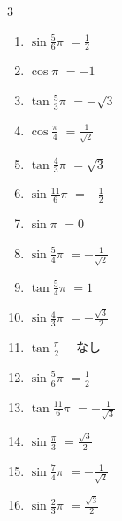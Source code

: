 \begin{multicols}{3}
\begin{enumerate}
  \item $\displaystyle \sin{\frac{5}{6}\pi}$
        $\displaystyle =\frac{1}{2}$

  \item $\displaystyle \cos{\pi}$
        $\displaystyle =-1$

  \item $\displaystyle \tan{\frac{5}{3}\pi}$
        $\displaystyle =-\sqrt{3}$

\columnbreak %

  \item $\displaystyle \cos{\frac{\pi}{4}}$
        $\displaystyle =\frac{1}{\sqrt{2}}$

  \item $\displaystyle \tan{\frac{4}{3}\pi}$
        $\displaystyle =\sqrt{3}$

  \item $\displaystyle \sin{\frac{11}{6}\pi}$
        $\displaystyle =-\frac{1}{2}$

  \item $\displaystyle \sin{\pi}$
        $\displaystyle =0$

  \item $\displaystyle \sin{\frac{5}{4}\pi}$
        $\displaystyle =-\frac{1}{\sqrt{2}}$

  \item $\displaystyle \tan{\frac{5}{4}\pi}$
        $\displaystyle =1$

  \item $\displaystyle \sin{\frac{4}{3}\pi}$
        $\displaystyle =-\frac{\sqrt{3}}{2}$

  \item $\displaystyle \tan{\frac{\pi}{2}}$
        $\displaystyle \quad なし$

  \item $\displaystyle \sin{\frac{5}{6}\pi}$
        $\displaystyle =\frac{1}{2}$

  \item $\displaystyle \tan{\frac{11}{6}\pi}$
        $\displaystyle =-\frac{1}{\sqrt{3}}$

  \item $\displaystyle \sin{\frac{\pi}{3}}$
        $\displaystyle =\frac{\sqrt{3}}{2}$

  \item $\displaystyle \sin{\frac{7}{4}\pi}$
        $\displaystyle =-\frac{1}{\sqrt{2}}$

  \item $\displaystyle \sin{\frac{2}{3}\pi}$
        $\displaystyle =\frac{\sqrt{3}}{2}$


\end{enumerate}
\end{multicols}
